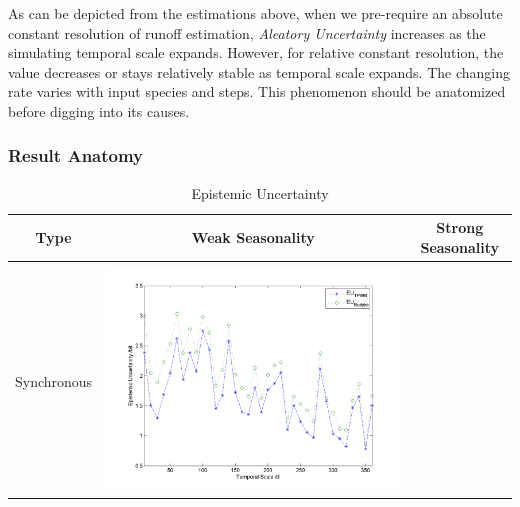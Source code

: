 \documentclass[11pt]{article}
\begin{document}
As can be depicted from the estimations above, when we pre-require an absolute constant resolution of runoff estimation, \emph{Aleatory Uncertainty} increases as the simulating temporal scale expands. However, for relative constant resolution, the value decreases or stays relatively stable as temporal scale expands. The changing rate varies with input species and steps.  This phenomenon should be anatomized before digging into its causes.

\subsubsection{Result Anatomy}

\begin{table}[H]\small
\caption{Epistemic Uncertainty}
\resizebox{\textwidth}{!}
{
\centering
\begin{tabular}{ccc}
\toprule
Type& Weak Seasonality & Strong Seasonality \\\hline
\\
Synchronous
&\begin{minipage}{.6\textwidth}\includegraphics[width=\linewidth]{resultgraph/05585000EU.png}\end{minipage}


\end{tabular}}
\end{table}
\end{document}
